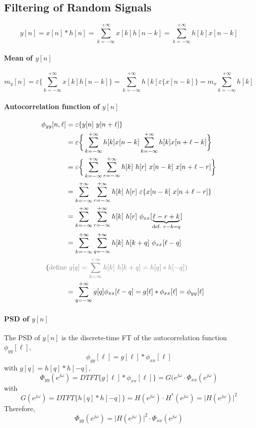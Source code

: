 \subsection{Filtering of Random Signals}
\[
    y[n] = x[n] * h[n] = \sum_{k=-\infty}^{+\infty} x[k] h[n-k] = \sum_{k=-\infty}^{+\infty} h[k]x[n-k]
\]
\paragraph{Mean of $y[n]$}
\[
    m_y[n] = \varepsilon\bigg\{ \sum_{k=-\infty}^{+\infty} x[k] h[n-k] \bigg\} = \sum_{k=-\infty}^{+\infty} h[k] \varepsilon\{x[n-k]\} = m_x \sum_{k=-\infty}^{+\infty} h[k]
\]
\paragraph{Autocorrelation function of $y[n]$}
\begin{align*}
    \phi_{yy}[n,\ell] 
    & = \varepsilon \{ y[n] \ y[n+\ell] \} \\
    & = \varepsilon \bigg\{ \sum_{k=-\infty}^{+\infty} h[k]x[n-k] \sum_{k=-\infty}^{+\infty} h[k] x[n+\ell-k] \bigg\} \\
    & = \varepsilon \bigg\{ \sum_{k=-\infty}^{+\infty} \sum_{r=-\infty}^{+\infty} h[k] \ h[r] \ x[n-k] \ x[n+\ell-r] \bigg\} \\
    & = \sum_{k=-\infty}^{+\infty} \sum_{r=-\infty}^{+\infty} h[k] \ h[r] \ \varepsilon \{ x[n-k] \ x[n+\ell-r] \} \\
    & = \sum_{k=-\infty}^{+\infty} \sum_{r=-\infty}^{+\infty} h[k] \ h[r] \ \phi_{xx}[\underbrace{\ell-r+k}_{\text{def.} \ r-k = q}] \\
    & = \sum_{k=-\infty}^{+\infty} \sum_{q=-\infty}^{+\infty} h[k] \ h[k+q] \ \phi_{xx}[\ell-q] \\
    & \hspace{-1cm} (\color{gray}\text{define} \ g[q] = \sum_{k=\infty}^{+\infty}h[k] \ h[k+q] = h[q] * h[-q]) \\
    & = \sum_{q=-\infty}^{+\infty} g[q] \phi_{xx}[\ell-q] = g[\ell]*\phi_{xx}[\ell] = \phi_{yy}[\ell]
\end{align*}

\paragraph{PSD of $y[n]$}
The PSD of $y[n]$ is the discrete-time FT of the autocorrelation function $\phi_{yy}[\ell]$,
\[
    \phi_{yy}[\ell] = g[\ell] * \phi_{xx}[\ell]
\]
with $g[q] = h[q] * h[-q]$,
\[  
    \Phi_{yy}(e^{j\omega}) = DTFT\{ g[\ell] * \phi_{xx}[\ell] \} = G(e^{j\omega} \cdot \Phi_{xx} (e^{j\omega})
\]
with 
\[
    G(e^{j\omega}) = DTFT \{ h[q] *h[-q] \} = H(e^{j\omega}) \cdot H^{*}(e^{j\omega}) = \lvert H(e^{j\omega}) \rvert^2
\]
Therefore, 
\[
    \Phi_{yy}(e^{j\omega}) = \lvert H(e^{j\omega}) \rvert^2 \cdot \Phi_{xx}(e^{j\omega})
\]

